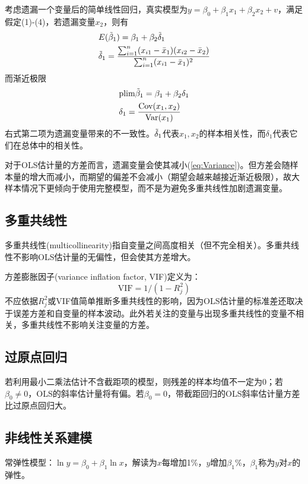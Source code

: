 \par 考虑遗漏一个变量后的简单线性回归，真实模型为$y=\beta_0+\beta_1x_1+\beta_2x_2+v$，满足假定(1)-(4)，若遗漏变量$x_2$，则有
\begin{align}
    &E(\Tilde{\beta}_1)=\beta_1+\beta_2\Tilde{\delta}_1\\ &\Tilde{\delta}_1=\frac{\sum_{i=1}^n (x_{i1}-\bar{x}_1)(x_{i2}-\bar{x}_2)}{\sum_{i=1}^n (x_{i1}-\bar{x}_1)^2}
\end{align}
而渐近极限
\begin{align}
    &\text{plim}\Tilde{\beta}_1=\beta_1+\beta_2\delta_1\\ &\delta_1=\frac{\text{Cov}(x_1,x_2)}{\text{Var}(x_1)}
\end{align}
右式第二项为遗漏变量带来的不一致性。$\Tilde{\delta}_1$代表$x_1,x_2$的样本相关性，而$\delta_1$代表它们在总体中的相关性。

\par 对于OLS估计量的方差而言，遗漏变量会使其减小(\ref{eq:Variance})。但方差会随样本量的增大而减小，而期望的偏差不会减小（期望会越来越接近渐近极限），故大样本情况下更倾向于使用完整模型，而不是为避免多重共线性加剧遗漏变量。

\subsection{多重共线性}

\par 多重共线性(multicollinearity)指自变量之间高度相关（但不完全相关）。多重共线性不影响OLS估计量的无偏性，但会使其方差增大。
\par 方差膨胀因子(variance inflation factor, VIF)定义为：
\begin{equation}
    \text{VIF}=1/(1-R_j^2)
\end{equation}
不应依据$R^2_j$或VIF值简单推断多重共线性的影响，因为OLS估计量的标准差还取决于误差方差和自变量的样本波动。此外若关注的变量与出现多重共线性的变量不相关，多重共线性不影响关注变量的方差。

\subsection{过原点回归}
\par 若利用最小二乘法估计不含截距项的模型，则残差的样本均值不一定为0；若$\beta_0\neq 0$，OLS的斜率估计量将有偏。若$\beta_0=0$，带截距回归的OLS斜率估计量方差比过原点回归大。

\subsection{非线性关系建模}
\par 常弹性模型：$\ln y=\beta_0+\beta_1 \ln x$，解读为$x$每增加1\%，$y$增加$\beta_1$\%，$\beta_1$称为$y$对$x$的弹性。

